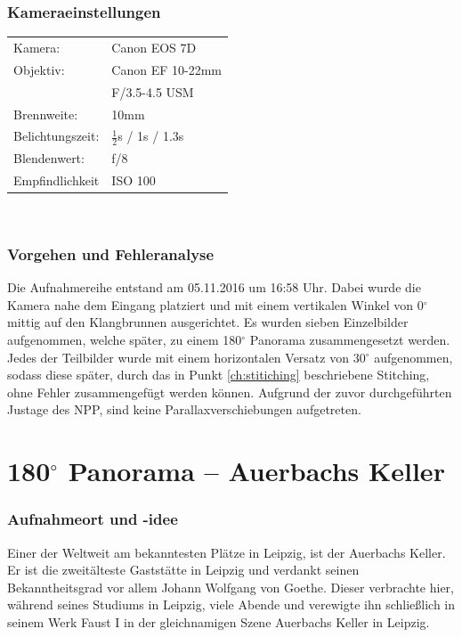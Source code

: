 \documentclass[liststotoc,bibtotoc,fontsize=14pt,]{scrreprt}
\begin{document}
	
		\subsubsection{Kameraeinstellungen}
		\begin{minipage}{0.58\textwidth}
			\begin{tabular}{ll}
				Kamera: &Canon EOS 7D \\
				Objektiv: &Canon EF 10-22mm \\
				& F/3.5-4.5 USM\\		
				Brennweite:& 10mm \\
				Belichtungszeit: & $\frac{1}{2}$s / 1s / 1.3s\\
				Blendenwert: & f/8\\
				Empfindlichkeit & ISO 100 \\
			\end{tabular}\\
		\end{minipage}%
		\begin{minipage}{0.42\textwidth}

		\end{minipage}%
		
	\subsubsection{Vorgehen und Fehleranalyse}
	 Die Aufnahmereihe entstand am 05.11.2016 um 16:58 Uhr. Dabei wurde die Kamera nahe dem Eingang platziert und mit einem vertikalen Winkel von 0$^\circ$ mittig auf den Klangbrunnen ausgerichtet. Es wurden sieben Einzelbilder aufgenommen, welche später, zu einem 180$^\circ$ Panorama zusammengesetzt werden. Jedes der Teilbilder wurde mit einem horizontalen Versatz von 30$^\circ$ aufgenommen, sodass diese später, durch das in Punkt \ref{ch:stitiching} beschriebene Stitching, ohne Fehler zusammengefügt werden können. Aufgrund der zuvor durchgeführten Justage des NPP, sind keine Parallaxverschiebungen aufgetreten.
	
	\section{180$^\circ$ Panorama -- Auerbachs Keller}
	\label{sec:auer}
	\subsubsection{Aufnahmeort und -idee}
	Einer der Weltweit am bekanntesten Plätze in Leipzig, ist der Auerbachs Keller. Er ist die zweitälteste Gaststätte in Leipzig und verdankt seinen Bekanntheitsgrad vor allem Johann Wolfgang von Goethe. Dieser verbrachte hier, während seines Studiums in Leipzig, viele Abende und verewigte ihn schließlich in seinem Werk Faust I in der gleichnamigen Szene \grqq{}Auerbachs Keller in Leipzig\grqq{}. 
	
\end{document}
